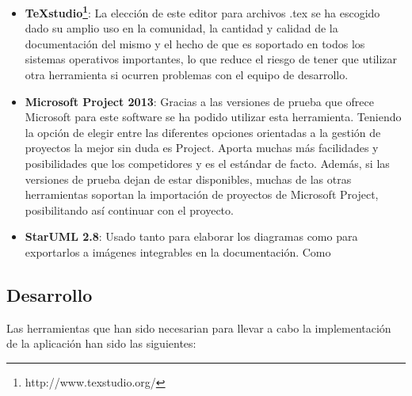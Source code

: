 \begin{itemize}
	\item \textbf{TeXstudio\footnote{http://www.texstudio.org/}}: La elección de este editor para archivos .tex se ha escogido dado su amplio uso en la comunidad, la cantidad y calidad de la documentación del mismo y el hecho de que es soportado en todos los sistemas operativos importantes, lo que reduce el riesgo de tener que utilizar otra herramienta si ocurren problemas con el equipo de desarrollo.
	\item \textbf{Microsoft Project 2013}: Gracias a las versiones de prueba que ofrece Microsoft para este software se ha podido utilizar esta herramienta. Teniendo la opción de elegir entre las diferentes opciones orientadas a la gestión de proyectos la mejor sin duda es Project. Aporta muchas más facilidades y posibilidades que los competidores y es el estándar de facto. Además, si las versiones de prueba dejan de estar disponibles, muchas de las otras herramientas soportan la importación de proyectos de Microsoft Project, posibilitando así continuar con el proyecto.
	\item \textbf{StarUML 2.8}: Usado tanto para elaborar los diagramas como para exportarlos a imágenes integrables en la documentación. Como 
\end{itemize}


\subsection{Desarrollo}

Las herramientas que han sido necesarian para llevar a cabo la implementación de la aplicación han sido las siguientes:

